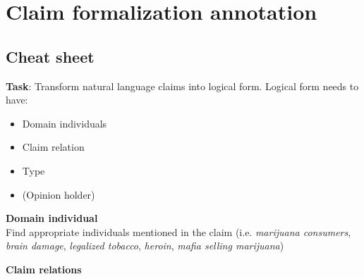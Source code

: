 \section{Claim formalization annotation}
\label{sec:formalization_annotation}

\subsection*{Cheat sheet}

\textbf{Task}: Transform natural language claims into logical form. Logical form needs to have:
\begin{itemize}
\item Domain individuals 
\item Claim relation
\item Type
\item (Opinion holder)
\end{itemize}

\vspace{0.3cm}

\noindent \textbf{Domain individual} \\
Find appropriate individuals mentioned in the claim (i.e. \textit{marijuana consumers},
\textit{brain damage}, \textit{legalized tobacco}, \textit{heroin}, \textit{mafia selling marijuana}) \\

\pagebreak

\noindent \textbf{Claim relations} \\

